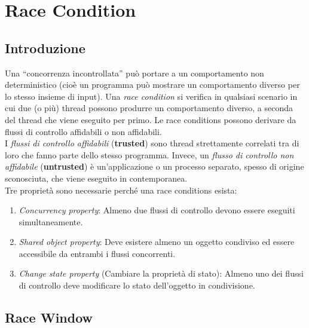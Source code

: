 \chapter{Race Condition}

\section{Introduzione}

Una ``concorrenza incontrollata'' può portare a un comportamento non deterministico
(cioè un programma può mostrare un comportamento diverso per lo stesso insieme
di input).
Una \textit{race condition} si verifica in qualsiasi scenario in cui due (o più)
thread possono
produrre un comportamento diverso, a seconda del thread che viene eseguito per primo.
Le race conditions possono derivare da flussi di controllo affidabili o non
affidabili.\\
I \textit{flussi di controllo affidabili} (\textbf{trusted}) sono thread
strettamente correlati tra di loro che fanno parte dello stesso programma.
Invece, un \textit{flusso di controllo non affidabile} (\textbf{untrusted})
è un'applicazione o un processo separato, spesso di origine sconosciuta,
che viene eseguito in contemporanea.\\

Tre proprietà sono necessarie perché una race conditions esista:
\begin{enumerate}
    \item \textit{Concurrency property}: Almeno due flussi di controllo
          devono essere eseguiti simultaneamente.
    \item \textit{Shared object property}: Deve esistere almeno un oggetto
          condiviso ed
          essere accessibile da
          entrambi i flussi concorrenti.
    \item \textit{Change state property} (Cambiare la proprietà di stato):
          Almeno uno dei flussi di
          controllo deve modificare lo stato dell'oggetto in condivisione.
\end{enumerate}

\newpage

\section{Race Window}

